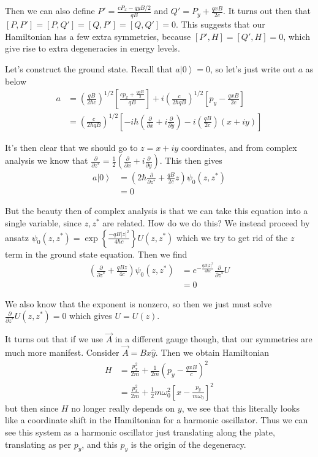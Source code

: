 \documentclass[10pt]{report}
\newcommand{\ket}[1]{\left|#1\right>}
\newcommand{\pd}[2]{\frac{\partial #1}{\partial#2}}
\newcommand{\abs}[1]{\left|#1\right|}
\begin{document}
Then we can also define $P' = \frac{cP_x - qyB/2}{qB}$ and $Q' = P_y + \frac{qxB}{2c}$. It turns out then that $\left[ P,P' \right] = \left[ P,Q' \right] = \left[ Q,P' \right] = \left[ Q,Q' \right] = 0$. This suggests that our Hamiltonian has a few extra symmetries, because $\left[ P',H \right] = \left[ Q',H \right] = 0$, which give rise to extra degeneracies in energy levels.

Let's construct the ground state. Recall that $a\ket{0} = 0$, so let's just write out $a$ as below
\begin{align}
    a &= \left( \frac{qB}{2\hbar c} \right)^{1/2} \left[ \frac{cp_x + \frac{qyB}{2}}{qB} \right] + i\left( \frac{c}{2\hbar qB} \right)^{1/2}\left[ p_y - \frac{qxB}{2c} \right]\\
    &= \left( \frac{c}{2\hbar qB} \right)^{1/2}\left[ -i\hbar \left( \pd{}{x} + i\pd{}{y} \right) - i\left( \frac{qB}{2c} \right)(x + iy) \right]
\end{align}

It's then clear that we should go to $z = x + iy$ coordinates, and from complex analysis we know that $\pd{}{z^*} = \frac{1}{2}\left( \pd{}{x} + i\pd{}{y} \right)$. This then gives
\begin{align}
    a\ket{0} &= \left( 2\hbar \pd{}{z^*} + \frac{qB}{2c}z \right)\psi_0(z,z^*)\\
    &= 0
\end{align}

But the beauty then of complex analysis is that we can take this equation into a single variable, since $z,z^*$ are related. How do we do this? We instead proceed by ansatz $\psi_0(z,z^*) = \exp\left\{ \frac{-qB\abs{z}^2}{4\hbar c} \right\}U(z,z^*)$ which we try to get rid of the $z$ term in the ground state equation. Then we find
\begin{align}
    \left( \pd{}{z^*} + \frac{qBz}{4c} \right)\psi_0(z,z^*) &= e^{-\frac{qB\abs{z}^2}{4\hbar c}}\pd{}{z^*}U\\
    &= 0
\end{align}

We also know that the exponent is nonzero, so then we just must solve $\pd{}{z^*}U(z,z^*) = 0$ which gives $U = U(z)$. 

It turns out that if we use $\vec{A}$ in a different gauge though, that our symmetries are much more manifest. Consider $\vec{A} = Bx\hat{y}$. Then we obtain Hamiltonian
\begin{align}
    H &= \frac{p_x^2}{2m} + \frac{1}{2m}\left( p_y - \frac{qxB}{c} \right)^2\\
    &= \frac{p_x^2}{2m} + \frac{1}{2}m\omega_0^2\left[ x - \frac{p_y}{m\omega_0} \right]^2
\end{align}
but then since $H$ no longer really depends on $y$, we see that this literally looks like a coordinate shift in the Hamiltonian for a harmonic oscillator. Thus we can see this system as a harmonic oscillator just translating along the plate, translating as per $p_y$, and this $p_y$ is the origin of the degeneracy.
\end{document}
